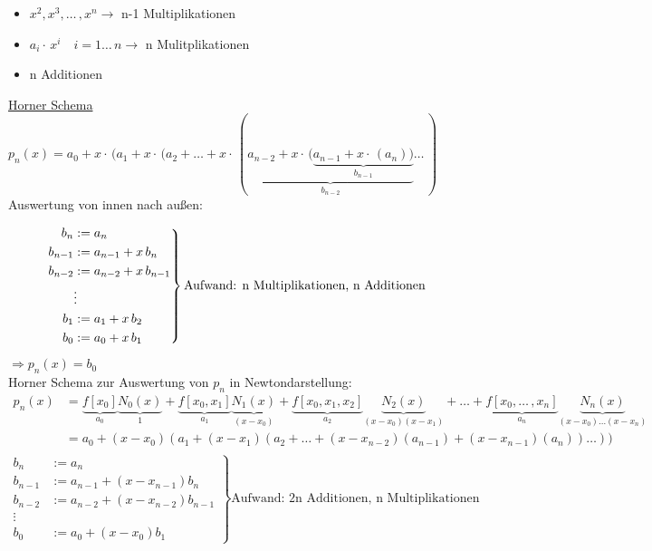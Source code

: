 \begin{itemize}
	\item $x^2, x^3,\ldots\,,x^n \rightarrow$ n-1 Multiplikationen
	\item $a_i\cdot\,x^i \quad i = 1\ldots\,n \rightarrow$ n Mulitplikationen
	\item n Additionen
\end{itemize}

\underline{Horner Schema}
$p_n(x) = a_0 + x\cdot\,(a_1 + x\cdot\,(a_2 + \ldots + x\cdot\,(\underbrace{a_{n-2} + x\cdot\,(\underbrace{a_{n-1} + x\cdot\,(a_n))}_{b_{n-1}}}_{b_{n-2}}\ldots\,)$
Auswertung von innen nach außen:

\begin{equation*}
\left.
\begin{aligned}
 b_n &:= a_n \\
 b_{n-1} &:= a_{n-1} + x\,b_n \\
 b_{n-2} &:= a_{n-2} + x\,b_{n-1} \\
 & \vdots \\
 b_{1} &:= a_{1} + x\,b_{2} \\
 b_{0} &:= a_{0} + x\,b_{1} 
\end{aligned}
\right\}
\text{Aufwand: } \\
\text{n Multiplikationen, n Additionen}
\end{equation*}
$\Rightarrow p_n(x) = b_0$\\

Horner Schema zur Auswertung von $p_n$ in Newtondarstellung:\\
\begin{align*}
 p_n(x) &= \underbrace{f[x_0]}_{a_0}\underbrace{N_0(x)}_{1} + \underbrace{f[x_0,x_1]}_{a_1}\underbrace{N_1(x)}_{(x-x_0)}
+ \underbrace{f[x_0,x_1,x_2]}_{a_2}\underbrace{N_2(x)}_{(x-x_0)(x-x_1)} + \ldots + \underbrace{f[x_0,\ldots\,,x_n]}_{a_n}\underbrace{N_n(x)}_{(x-x_0)\ldots(x-x_n)} \\
 &= a_0 + (x-x_0)(a_1 + (x-x_1)(a_2+ \ldots + (x-x_{n-2})(a_{n-1})+(x-x_{n-1})(a_n))\ldots)) \\
\end{align*}
\begin{equation*}
\left.
\begin{aligned}
 b_n &:= a_n \\
 b_{n-1} &:= a_{n-1} + (x-x_{n-1})b_n \\
 b_{n-2} &:= a_{n-2} + (x-x_{n-2})b_{n-1} \\
 \vdots \\
 b_0 &:= a_0 + (x-x_0)b_1
\end{aligned}
\right\}
\text{Aufwand: }
\text{2n Additionen, n Multiplikationen}
\end{equation*}

